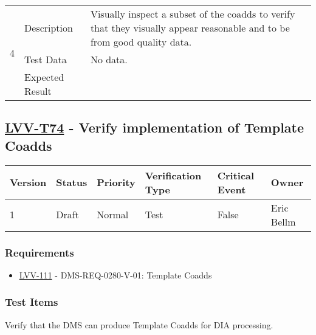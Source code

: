 \begin{longtable}[]{p{1.3cm}p{2cm}p{13cm}}
            \multirow{3}{*}{ 4 } & Description &
            \begin{minipage}[t]{13cm}{\footnotesize
            Visually inspect a subset of the coadds to verify that they visually
appear reasonable and to be from good quality data.

            \vspace{\dp0}
            } \end{minipage} \\ \cline{2-3}
            & Test Data &
            \begin{minipage}[t]{13cm}{\footnotesize
                No data.
                \vspace{\dp0}
            } \end{minipage} \\ \cline{2-3}
            & Expected Result &
        \\ \midrule
    \end{longtable}

\subsection{\href{https://jira.lsstcorp.org/secure/Tests.jspa\#/testCase/LVV-T74}{LVV-T74}
    - Verify implementation of Template Coadds}\label{lvv-t74}

\begin{longtable}[]{llllll}
\toprule
Version & Status & Priority & Verification Type & Critical Event & Owner
\\\midrule
1 & Draft & Normal &
Test & False & Eric Bellm
\\\bottomrule
\end{longtable}

\subsubsection{Requirements}
\begin{itemize}
\item \href{https://jira.lsstcorp.org/browse/LVV-111}{LVV-111} - DMS-REQ-0280-V-01: Template Coadds
\end{itemize}

\subsubsection{Test Items}
Verify that the DMS can produce Template Coadds for DIA processing.




